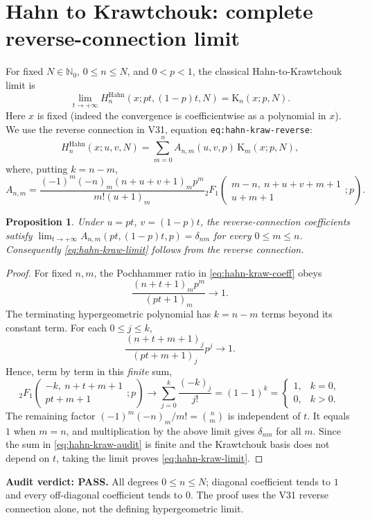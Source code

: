 \documentclass[11pt]{article}
\newtheorem{proposition}{Proposition}
\begin{document}
\section{Hahn to Krawtchouk: complete reverse-connection limit}
For fixed $N\in\mathbb N_0$, $0\le n\le N$, and $0<p<1$, the classical Hahn-to-Krawtchouk limit is
\begin{equation}\label{eq:hahn-kraw-limit}
\lim_{t\to+\infty}H_n^{\mathrm{Hahn}}(x;pt,(1-p)t,N)=\mathrm K_n(x;p,N).
\end{equation}
Here $x$ is fixed (indeed the convergence is coefficientwise as a polynomial in $x$). We use the reverse connection in V31, equation \texttt{eq:hahn-kraw-reverse}:
\begin{equation}\label{eq:hahn-kraw-audit}
H_n^{\mathrm{Hahn}}(x;u,v,N)=\sum_{m=0}^n A_{n,m}(u,v,p)\,\mathrm K_m(x;p,N),
\end{equation}
where, putting $k=n-m$,
\begin{equation}\label{eq:hahn-kraw-coeff}
A_{n,m}=\frac{(-1)^m(-n)_m(n+u+v+1)_m p^m}{m!(u+1)_m}
{}_2F_1\!\left(\begin{matrix}m-n,\ n+u+v+m+1\\u+m+1\end{matrix};p\right).
\end{equation}
\begin{proposition}
Under $u=pt$, $v=(1-p)t$, the reverse-connection coefficients satisfy
$\lim_{t\to+\infty}A_{n,m}(pt,(1-p)t,p)=\delta_{nm}$ for every $0\le m\le n$.
Consequently \eqref{eq:hahn-kraw-limit} follows from the reverse connection.
\end{proposition}
\begin{proof}
For fixed $n,m$, the Pochhammer ratio in \eqref{eq:hahn-kraw-coeff} obeys
\[
\frac{(n+t+1)_m p^m}{(pt+1)_m}\longrightarrow1.
\]
The terminating hypergeometric polynomial has $k=n-m$ terms beyond its constant term. For each $0\le j\le k$,
\[
\frac{(n+t+m+1)_j}{(pt+m+1)_j}p^j\longrightarrow1.
\]
Hence, term by term in this \emph{finite} sum,
\[
{}_2F_1\!\left(\begin{matrix}-k,\ n+t+m+1\\pt+m+1\end{matrix};p\right)
\longrightarrow \sum_{j=0}^k\frac{(-k)_j}{j!}
=(1-1)^k=\begin{cases}1,&k=0,\\0,&k>0.\end{cases}
\]
The remaining factor $(-1)^m(-n)_m/m!=\binom nm$ is independent of $t$. It equals $1$ when $m=n$, and multiplication by the above limit gives $\delta_{nm}$ for all $m$. Since the sum in \eqref{eq:hahn-kraw-audit} is finite and the Krawtchouk basis does not depend on $t$, taking the limit proves \eqref{eq:hahn-kraw-limit}.
\end{proof}
\noindent\textbf{Audit verdict: PASS.} All degrees $0\le n\le N$; diagonal coefficient tends to $1$ and every off-diagonal coefficient tends to $0$. The proof uses the V31 reverse connection alone, not the defining hypergeometric limit.
\end{document}
